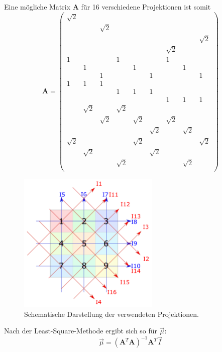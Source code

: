 Eine mögliche Matrix $\mathbf{A}$ für 16 verschiedene Projektionen ist somit
\[
\mathbf{A} = \left(
\begin{matrix}
\sqrt{2} &  &  &  &  &  &  &  & \\
 &  & \sqrt{2} &  &  &  &  &  & \\
 &  &  &  &  &  &  &  & \sqrt{2}\\
 &  &  &  &  &  & \sqrt{2} &  &\\
1 &  &  & 1 &  &  & 1 &  &  \\
 & 1 &  &  & 1 &  &  & 1 &  \\
 &  & 1 &  &  & 1 &  &  & 1 \\
1 & 1 & 1 &  &  &  &  &  &  \\
 &  &  & 1 & 1 & 1 &  &  &  \\
 &  &  &  &  &  & 1 & 1 & 1 \\
 & \sqrt{2} &  & \sqrt{2} &  &  &  &  &  \\
 &  & \sqrt{2} &  & \sqrt{2} &  & \sqrt{2} &  &  \\
 &  &  &  &  & \sqrt{2} &  & \sqrt{2} &  \\
\sqrt{2} &  &  &  & \sqrt{2} &  &  &  & \sqrt{2} \\
 & \sqrt{2} &  &  &  & \sqrt{2} &  &  &  \\
 &  &  & \sqrt{2} &  &  &  & \sqrt{2} &  \\
\end{matrix}
\right)
\]

\begin{figure}
\centering
\includegraphics[keepaspectratio,width=0.6\textwidth]{content/images/Zeichnung.pdf}
\caption{Schematische Darstellung der verwendeten Projektionen.}
\label{fig:aufbau}
\end{figure}

Nach der Least-Square-Methode ergibt sich so für $\vec{\mu}$:
\begin{equation}
\vec{\mu} = (\mathbf{A}^T \mathbf{A})^{-1} \mathbf{A}^T \vec{I}\label{eq:mu2}
\end{equation}


